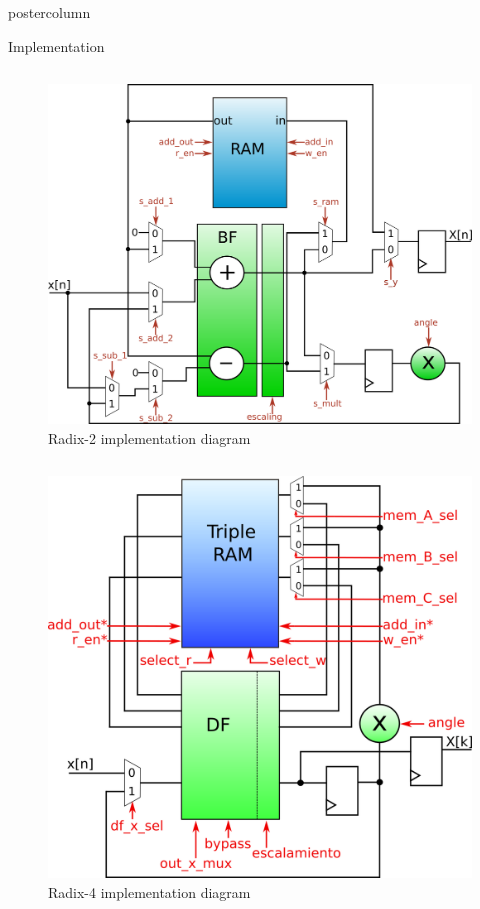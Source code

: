 \documentclass[final]{beamer}
\begin{document}
\begin{frame}{}
\begin{columns}
\begin{column}{.5\textwidth}
\begin{beamercolorbox}[center,wd=0.9\textwidth]{postercolumn}
\begin{minipage}[T]{.99\textwidth}
{\begin{block}{Implementation}
			\begin{column}{.44\textwidth}
				\begin{figure}[htb!]
				        \centering
				        \includegraphics[width=14cm]{./figures/datapathMem.png}
				        \caption{Radix-2 implementation diagram}
				        \label{fig:datapathmem}
				\end{figure}
			\end{column}
			\begin{column}{.45\textwidth}
				\begin{figure}[htb!]
				        \centering
				        \includegraphics[width=13cm]{./figures/r4control.png}
				        \caption{Radix-4 implementation diagram}
				        \label{fig:datapathR4control}
				\end{figure}
			\end{column}
	      

\end{block}}
\end{minipage}
\end{beamercolorbox}
\end{column}
\end{columns}
\end{frame}
\end{document}
